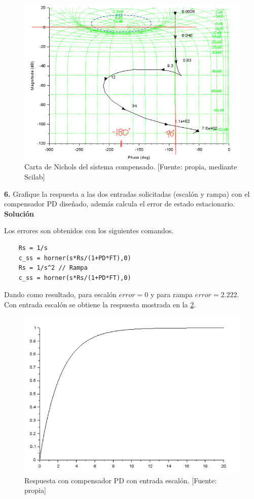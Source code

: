 \documentclass[12pt,letterpaper]{article}
\begin{document}
\begin{figure}[hbtp]
	\centering
	\includegraphics[width = 0.7 \columnwidth]{nichols2.png} 
	\caption[Figura7]{Carta de Nichols del sistema compensado. [Fuente: propia, mediante Scilab]} 
	\label{fig:fig7} 
\end{figure}

\bigskip

\bigskip

\textbf{6.} Grafique la respuesta a las dos entradas solicitadas (escalón y rampa) con el compensador PD diseñado, además calcula el error de estado estacionario.\\

\textbf{Solución}

\bigskip

Los errores son obtenidos con los siguientes comandos.

\begin{verbatim}
    Rs = 1/s 
    c_ss = horner(s*Rs/(1+PD*FT),0)
    Rs = 1/s^2 // Rampa
    c_ss = horner(s*Rs/(1+PD*FT),0)
\end{verbatim}

Dando como resultado, para escalón $error = 0$ y para rampa $error = 2.222$.\\

Con entrada escalón se obtiene la respuesta mostrada en la \ref{fig:fig8}.\\

\begin{figure}[hbtp]
	\centering
	\includegraphics[width = .65 \columnwidth]{6escalon.png} 
	\caption[Figura7]{Respuesta con compensador PD con entrada escalón. [Fuente: propia]} 
	\label{fig:fig8} 
\end{figure}
\end{document}
